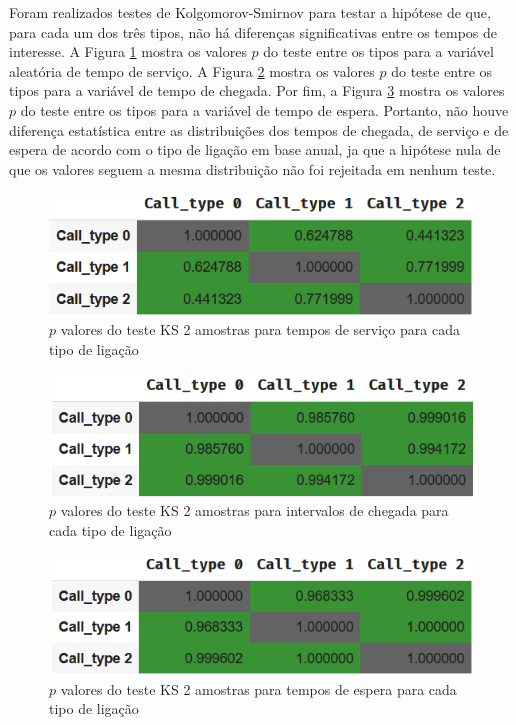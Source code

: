 Foram realizados testes de Kolgomorov-Smirnov para testar a hipótese de que, para cada um dos três tipos, não há diferenças significativas entre os tempos de interesse. A Figura \ref*{fig: KS_tipos_servico} mostra os valores $p$ do teste entre os tipos para a variável aleatória de tempo de serviço. A Figura \ref*{fig: KS_tipos_chegada} mostra os valores $p$ do teste entre os tipos para a variável de tempo de chegada. Por fim, a Figura \ref*{fig: KS_tipos_espera} mostra os valores $p$ do teste entre os tipos para a variável de tempo de espera. Portanto, não houve diferença estatística entre as distribuições dos tempos de chegada, de serviço e de espera de acordo com o tipo de ligação em base anual, ja que a hipótese nula de que os valores seguem a mesma distribuição não foi rejeitada em nenhum teste.

\begin{figure}[H]
    \centering
    \includegraphics{analise-de-dados/anual/ks-tipos-service.png}
    \caption{$p$ valores do teste KS 2 amostras para tempos de serviço para cada tipo de ligação}
    \label{fig: KS_tipos_servico}
\end{figure}

\begin{figure}[H]
    \centering
    \includegraphics{analise-de-dados/anual/ks-tipos-chegadas.png}
    \caption{$p$ valores do teste KS 2 amostras para intervalos de chegada para cada tipo de ligação}
    \label{fig: KS_tipos_chegada}
\end{figure}

\begin{figure}[H]
    \centering
    \includegraphics{analise-de-dados/anual/ks-tipos-espera.png}
    \caption{$p$ valores do teste KS 2 amostras para tempos de espera para cada tipo de ligação}
    \label{fig: KS_tipos_espera}
\end{figure}
